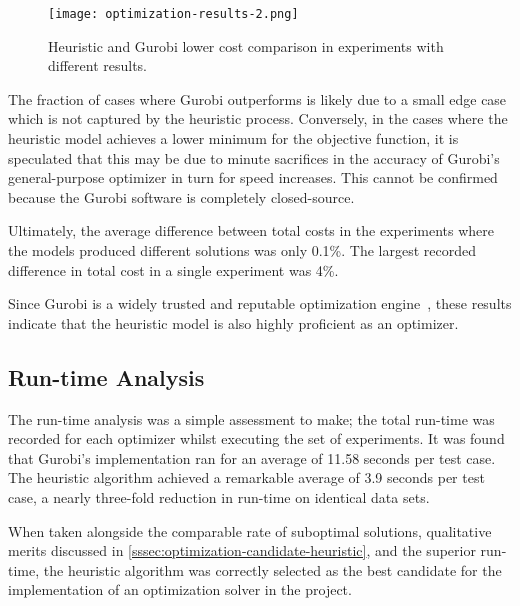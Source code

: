 \documentclass[../mthe-493-final-project.tex]{subfiles}
\begin{document}
    \begin{figure}
        \centering
        \texttt{[image: optimization-results-2.png]}
        \caption{Heuristic and Gurobi lower cost comparison in experiments with different results.}
        \label{fig:optimization-results-2}
    \end{figure}

    The fraction of cases where Gurobi outperforms is likely due to a small edge case which is not captured by the heuristic process. Conversely, in the cases where the heuristic model achieves a lower minimum for the objective function, it is speculated that this may be due to minute sacrifices in the accuracy of Gurobi's general-purpose optimizer in turn for speed increases. This cannot be confirmed because the Gurobi software is completely closed-source.
    
    Ultimately, the average difference between total costs in the experiments where the models produced different solutions was only 0.1\%. The largest recorded difference in total cost in a single experiment was 4\%.
    
    Since Gurobi is a widely trusted and reputable optimization engine~\cite{gurobi}, these results indicate that the heuristic model is also highly proficient as an optimizer.
    
    \subsection{Run-time Analysis}
    
    The run-time analysis was a simple assessment to make; the total run-time was recorded for each optimizer whilst executing the set of experiments. It was found that Gurobi's implementation ran for an average of 11.58 seconds per test case. The heuristic algorithm achieved a remarkable average of 3.9 seconds per test case, a nearly three-fold reduction in run-time on identical data sets.
    
    When taken alongside the comparable rate of suboptimal solutions, qualitative merits discussed in \autoref{sssec:optimization-candidate-heuristic}, and the superior run-time, the heuristic algorithm was correctly selected as the best candidate for the implementation of an optimization solver in the project.
    
\end{document}
